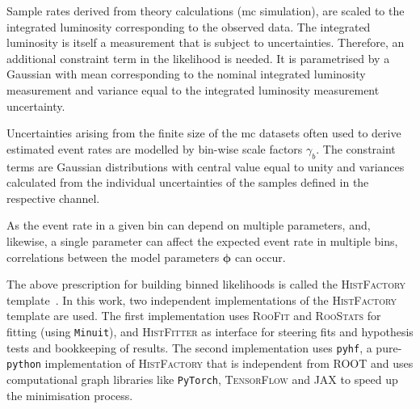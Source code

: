 Sample rates derived from theory calculations (\ie \gls{mc} simulation), are scaled to the integrated luminosity corresponding to the observed data. The integrated luminosity is itself a measurement that is subject to uncertainties. Therefore, an additional constraint term in the likelihood is needed. It is parametrised by a Gaussian with mean corresponding to the nominal integrated luminosity measurement and variance equal to the integrated luminosity measurement uncertainty.

Uncertainties arising from the finite size of the \gls{mc} datasets often used to derive estimated event rates are modelled by bin-wise scale factors $\gamma_b$. The constraint terms are Gaussian distributions with central value equal to unity and variances calculated from the individual uncertainties of the samples defined in the respective channel.

As the event rate in a given bin can depend on multiple parameters, and, likewise, a single parameter can affect the expected event rate in multiple bins, correlations between the model parameters $\boldsymbol{\phi}$ can occur.

The above prescription for building binned likelihoods is called the \textsc{HistFactory} template~\cite{Cranmer:1456844}. In this work, two independent implementations of the \textsc{HistFactory} template are used. The first implementation uses \textsc{RooFit} and \textsc{RooStats} for fitting (using \texttt{Minuit}), and \textsc{HistFitter} as interface for steering fits and hypothesis tests and bookkeeping of results. The second implementation uses \texttt{pyhf}, a pure-\texttt{python} implementation of \textsc{HistFactory} that is independent from \textsc{ROOT} and uses computational graph libraries like \texttt{PyTorch}, \textsc{TensorFlow} and \textsc{JAX} to speed up the minimisation process.
 


